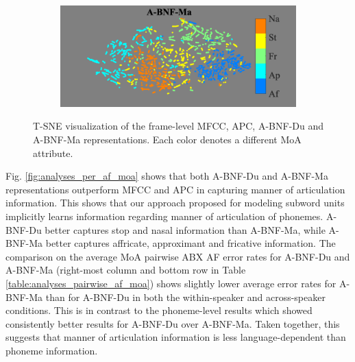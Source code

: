 \documentclass[transmag]{IEEEtran}
\begin{document}
\begin{figure}[!t]
\begin{subfigure}{0.49\linewidth}
    \end{subfigure}    \begin{subfigure}{0.49\linewidth}
	   \centering
	   \includegraphics[width=1\linewidth]{tsne_af_moa_bnf_aidatatang_apc_input_disc_bar_adjust_journal.png}
    \end{subfigure}
    \caption{T-SNE visualization of the frame-level MFCC, APC, A-BNF-Du and A-BNF-Ma representations. Each color denotes a different MoA attribute.}
    \label{fig:analysis_tsne_moa}
\end{figure}

Fig. \ref{fig:analyses_per_af_moa} shows that both A-BNF-Du and A-BNF-Ma representations outperform MFCC and APC in capturing manner of articulation information. This shows that our approach proposed for modeling subword units implicitly learns information regarding  manner of articulation of phonemes. A-BNF-Du better captures stop and nasal information than A-BNF-Ma, while A-BNF-Ma better captures affricate, approximant and fricative information. The comparison on the average MoA pairwise ABX AF error rates for A-BNF-Du and A-BNF-Ma (right-most column and bottom row in Table \ref{table:analyses_pairwise_af_moa}) shows slightly lower average error rates for A-BNF-Ma than for A-BNF-Du in both the within-speaker and across-speaker conditions. This is in contrast to the phoneme-level results which showed consistently better results for A-BNF-Du over A-BNF-Ma. Taken together, this suggests that manner of articulation information is less language-dependent than phoneme information.
\end{document}
